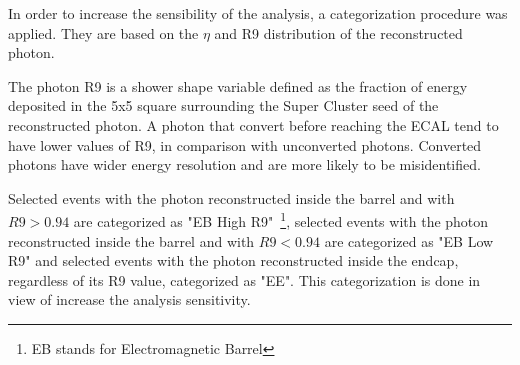 In order to increase the sensibility of the analysis, a categorization procedure was applied.
 They are based on the $\eta$ and R9 distribution of the reconstructed photon.

The photon R9 is a shower shape variable defined as the fraction of energy deposited in the 5x5 square surrounding the Super Cluster seed of the reconstructed photon. A photon that convert before reaching the ECAL tend to have lower values of R9, in comparison with unconverted photons. Converted photons have wider energy resolution and are more likely to be misidentified.






Selected events with the photon reconstructed inside the barrel and with $R9 > 0.94$ are categorized as "EB High R9"~\footnote{EB stands for Electromagnetic Barrel}, selected events with the photon reconstructed inside the barrel and with $R9 < 0.94$ are categorized as "EB Low R9" and selected events with the photon reconstructed inside the endcap, regardless of its R9 value, categorized as "EE". This categorization is done in view of increase the analysis sensitivity. 

